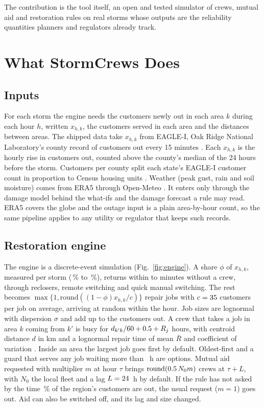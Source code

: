 \documentclass[conference,letterpaper]{IEEEtran}
\begin{document}
The contribution is the tool itself, an open and tested simulator of crews, mutual aid and restoration rules on
\nStorms{} real storms whose outputs are the reliability quantities planners and regulators already track.

\section{What StormCrews Does}\label{sec:what}

\subsection{Inputs}

For each storm the engine needs the customers newly out in each area $k$ during each hour $h$, written $x_{h,k}$,
the customers served in each area and the distances between areas. The shipped data take $x_{h,k}$ from EAGLE-I, Oak
Ridge National Laboratory's county record of customers out every 15 minutes \cite{brelsford2024eaglei,eaglei2026data}.
Each $x_{h,k}$ is the hourly rise in customers out, counted above the county's median of the 24 hours before the
storm. Customers per county split each state's EAGLE-I customer count in proportion to Census housing units
\cite{census2021acs}. Weather (peak gust, rain and soil moisture) comes from ERA5 through Open-Meteo
\cite{hersbach2020era5,c3s2018era5,zippenfenig2024openmeteo}. It enters only through the
damage model behind the what-ifs and the damage forecast a rule may read. ERA5 covers the globe and the outage input is
a plain area-by-hour count, so the same pipeline applies to any utility or regulator that keeps such records.

\subsection{Restoration engine}

The engine is a discrete-event simulation (Fig.~\ref{fig:engine}). A share $\phi$ of $x_{h,k}$, measured per storm
(\autoMin\,\% to \autoMax\,\%), returns within \autoLoMin{} to \autoHiMin{} minutes without a crew, through reclosers,
remote switching and quick manual switching. The rest becomes $\max\{1,\mathrm{round}((1-\phi)x_{h,k}/c)\}$ repair
jobs with $c=35$ customers per job on average, arriving at random within the hour. Job sizes are lognormal
with dispersion $\sigma$ and add up to the customers out. A crew that takes a job in area $k$ coming from $k'$ is busy
for $d_{k'k}/60+0.5+R_j$ hours, with centroid distance $d$ in km and a lognormal repair time of mean $\bar
R$ and coefficient of variation \repairCV. Inside an area the largest job goes first by default. Oldest-first and a
guard that serves any job waiting more than \guardH{}~h are options. Mutual aid requested with multiplier $m$ at hour
$\tau$ brings $\mathrm{round}(0.5\,N_0m)$ crews at $\tau+L$, with $N_0$ the local fleet and a lag $L=24$~h
by default. If the rule has not asked by the time \triggerPct\,\% of the region's customers are out, the usual request
($m=1$) goes out. Aid can also be switched off, and its lag and size changed.
\end{document}
